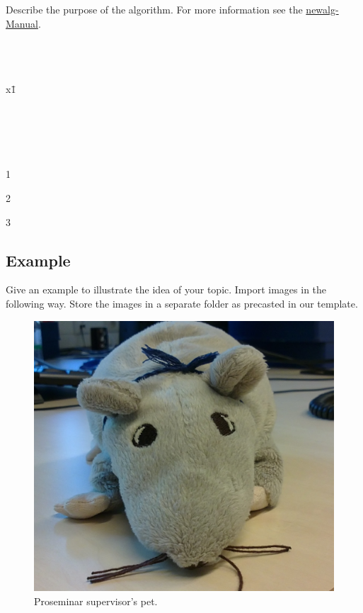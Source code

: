 \begin{Algorithm}
	\caption{Describe the purpose of the algorithm. For more 
	information see the \href{../manuals/newalg.pdf}{newalg-
	Manual}.}
	\label{alg:nameOfAlgorithm}
	\begin{algorithm}{}{}
		 \\
		 \\
		 \\
		x\=1 \\
		\begin{WHILE}{}
			 \\
			 \\
		\end{WHILE} \\
		\begin{IF}{}
			1 \\
		\ELSE
			\begin{IF}{}
				2 \\
			\end{IF}
		\ELSE
			3 \\
		\end{IF}
		\RETURN \True
	\end{algorithm}
\end{Algorithm}

\subsection{Example}
Give an example to illustrate the idea of your topic. Import images
in the following way. Store the images in a separate folder as 
precasted in our template.

\begin{figure}[htb]
	\begin{center}
		\includegraphics[width=0.8\linewidth]{pictures/ratte.jpg}
	\end{center}
	\caption{Proseminar supervisor's pet.}
	\label{fig:rat}
\end{figure}
